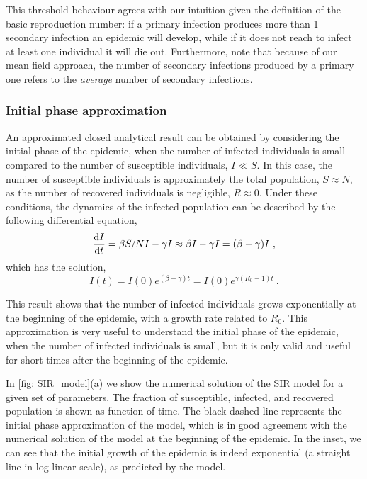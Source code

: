 This threshold behaviour agrees with our intuition given the definition of
the basic reproduction number: if a primary infection produces more than 1
secondary infection an epidemic will develop, while if it does not reach to
infect at least one individual it will die out. Furthermore, note that
because of our mean field approach, the number of secondary infections produced
by a primary one refers to the \textit{average} number of secondary
infections.

\subsubsection*{Initial phase approximation}

An approximated closed analytical result can be obtained by considering the
initial phase of the epidemic, when the number of infected individuals is small
compared to the number of susceptible individuals, $I\ll S$. In this case, the
number of susceptible individuals is approximately the total population,
$S\approx N$, as the number of recovered individuals is negligible,
$R\approx0$. Under these conditions, the dynamics of the infected population
can be described by the following differential equation,
\begin{equation}
  \frac{\mathrm{d} I}{\mathrm{d} t}=\beta S/N I-\gamma I\approx\beta I-\gamma I=(\beta-\gamma)I \ ,
\end{equation}
which has the solution,
\begin{equation}
  I(t)=I(0)e^{(\beta-\gamma)t}=I(0)e^{\gamma(R_0-1)t} \ .
\end{equation}

This result shows that the number of infected individuals grows exponentially
at the beginning of the epidemic, with a growth rate related to $R_0$.
This approximation is very useful to understand the initial phase of the
epidemic, when the number of infected individuals is small, but it is only
valid and useful for short times after the beginning of the epidemic.

In \cref{fig: SIR_model}(a) we show the numerical solution of the SIR model for
a given set of parameters. The fraction of susceptible, infected, and recovered
population is shown as function of time. The black dashed line represents the
initial phase approximation of the model, which is in good agreement with the
numerical solution of the model at the beginning of the epidemic. In the inset,
we can see that the initial growth of the epidemic is indeed exponential
(a straight line in log-linear scale), as predicted by the model.

